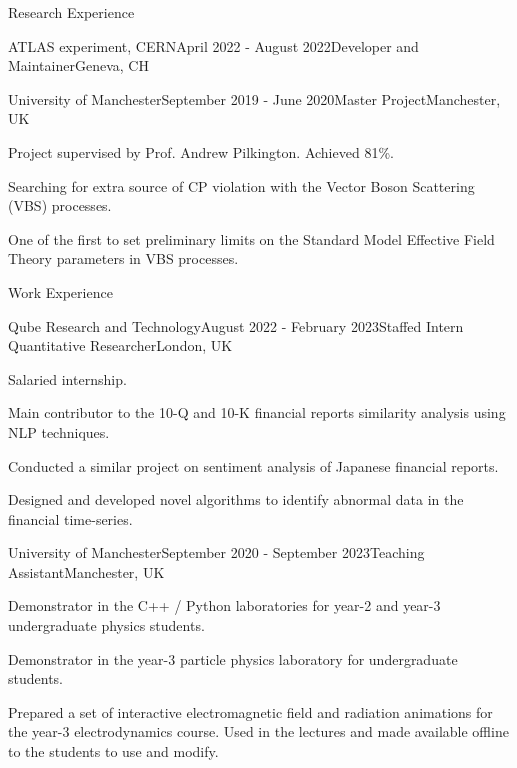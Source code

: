 \documentclass{resume} %
\begin{document}
\begin{rSection}{Research Experience}
\begin{rSubsection}{ATLAS experiment, CERN}{April 2022 - August 2022}{Developer and Maintainer}{Geneva, CH}
        \end{rSubsection}
        \begin{rSubsection}{University of Manchester}{September 2019 - June 2020}{Master Project}{Manchester, UK}
            \item   Project supervised by Prof. Andrew Pilkington. Achieved 81\%.
            \item   Searching for extra source of CP violation with the Vector Boson Scattering (VBS) processes.
            \item   One of the first to set preliminary limits on the Standard Model Effective Field Theory parameters in VBS processes.
        \end{rSubsection}
    \end{rSection}

    \begin{rSection}{Work Experience}
        \begin{rSubsection}{Qube Research and Technology}{August 2022 - February 2023}{Staffed Intern Quantitative Researcher}{London, UK}
            \item Salaried internship.
            \item Main contributor to the 10-Q and 10-K financial reports similarity analysis using NLP techniques.
            \item Conducted a similar project on sentiment analysis of Japanese financial reports.
            \item Designed and developed novel algorithms to identify abnormal data in the financial time-series.
        \end{rSubsection}
        \begin{rSubsection}{University of Manchester}{September 2020 - September 2023}{Teaching Assistant}{Manchester, UK}
            \item   Demonstrator in the C++ / Python laboratories for year-2 and year-3 undergraduate physics students.
            \item   Demonstrator in the year-3 particle physics laboratory for undergraduate students. 
            \item   Prepared a set of interactive electromagnetic field and radiation animations 
                for the year-3 electrodynamics course. Used in the lectures and made available 
                offline to the students to use and modify.
        \end{rSubsection}
    \end{rSection}
\end{document}
